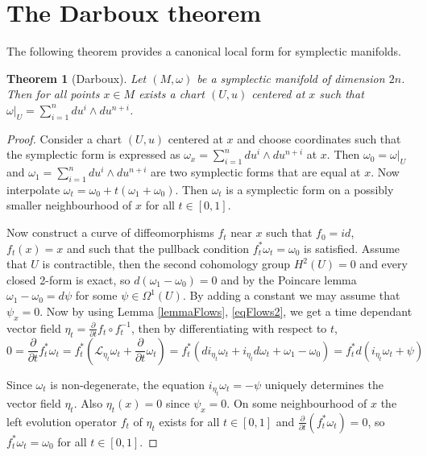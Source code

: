 \documentclass{article}
\newtheorem{theorem}{Theorem}
\numberwithin{theorem}{section}
\theoremstyle{definition}
\begin{document}
\section{The Darboux theorem}
The following theorem provides a canonical local form for symplectic manifolds.

\begin{theorem}[Darboux]
    Let $(M,\omega)$ be a symplectic manifold of dimension $2n$. Then for all points $x \in M$ exists a chart $(U,u)$ centered at $x$ such that $\omega |_U = \sum_{i=1}^{n} du^i \wedge du^{n+i}$.
\end{theorem}

\begin{proof}
    Consider a chart $(U,u)$ centered at $x$ and choose coordinates such that the symplectic form is expressed as $\omega_x = \sum_{i=1}^{n} du^i \wedge du^{n+i}$ at $x$. Then $\omega_0 = \omega |_U$ and $\omega_1 = \sum_{i=1}^{n} du^i \wedge du^{n+i}$ are two symplectic forms that are equal at $x$. Now interpolate $\omega_t = \omega_0 + t(\omega_1 + \omega_0)$. Then $\omega_t$ is a symplectic form on a possibly smaller neighbourhood of $x$ for all $t \in [0,1]$.

    Now construct a curve of diffeomorphisms $f_t$ near $x$ such that $f_0 = id$, $f_t(x) = x$ and such that the pullback condition $f^*_t \omega_t = \omega_0$ is satisfied. Assume that $U$ is contractible, then the second cohomology group $H^2(U) = 0$ and every closed 2-form is exact, so $d(\omega_1 - \omega_0) = 0$ and by the Poincare lemma $\omega_1-\omega_0 = d \psi$ for some $\psi \in \Omega^1(U)$. By adding a constant we may assume that $\psi_x = 0$. Now by using Lemma \ref{lemmaFlows}, \eqref{eqFlows2}, we get a time dependant vector field $\eta_t = \frac{\partial}{\partial t}f_t \circ f^{-1}_t$, then by differentiating with respect to $t$,
    \begin{equation*}
        0=\frac{\partial}{\partial t} f_t^* \omega_t=f_t^*\left(\mathcal{L}_{\eta_t} \omega_t+\frac{\partial}{\partial t} \omega_t \right) = f_t^*\left(d i_{\eta_t} \omega_t+i_{\eta_t} d \omega_t+\omega_1-\omega_0\right)=f_t^* d\left(i_{\eta_t}\omega_t + \psi\right)
    \end{equation*}

    Since $\omega_t$ is non-degenerate, the equation $i_{\eta_t}\omega_t = -\psi$ uniquely determines the vector field $\eta_t$. Also $\eta_t(x) = 0$ since $\psi_x = 0$. On some neighbourhood of $x$ the left evolution operator $f_t$ of $\eta_t$ exists for all $t \in [0,1]$ and $\frac{\partial}{\partial t}(f^*_t\omega_t) = 0$, so $f_t^*\omega_t = \omega_0$ for all $t \in [0,1]$.
\end{proof}
\end{document}
